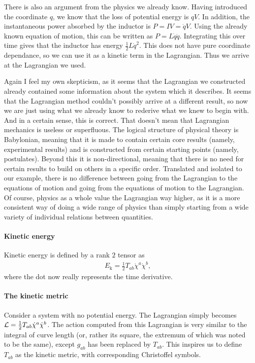 There is also an argument from the physics we already know. Having introduced the coordinate $q$, we know that the loss of potential energy is $qV$. In addition, the instantaneous power absorbed by the inductor is $P = IV = \dot{q}V$. Using the already known equation of motion, this can be written as $P = L\dot{q}\ddot{q}$. Integrating this over time gives that the inductor has energy $\frac{1}{2}L\dot{q}^{2}$. This does not have pure coordinate dependance, so we can use it as a kinetic term in the Lagrangian. Thus we arrive at the Lagrangian we used.

Again I feel my own skepticism, as it seems that the Lagrangian we constructed already contained some information about the system which it describes. It seems that the Lagrangian method couldn't possibly arrive at a different result, so now we are just using what we already know to rederive what we knew to begin with. And in a certain sense, this is correct. That doesn't mean that Lagrangian mechanics is useless or superfluous. The logical structure of physical theory is Babylonian, meaning that it is made to contain certain core results (namely, experimental results) and is constructed from certain starting points (namely, postulates). Beyond this it is non-directional, meaning that there is no need for certain results to build on others in a specific order. Translated and isolated to our example, there is no difference between going from the Lagrangian to the equations of motion and going from the equations of motion to the Lagrangian. Of course, physics as a whole value the Lagrangian way higher, as it is a more consistent way of doing a wide range of physics than simply starting from a wide variety of individual relations between quantities.

\paragraph{Kinetic energy}
Kinetic energy is defined by a rank $2$ tensor as
\begin{align*}
	E_{\text{k}} = \frac{1}{2}T_{ab}\dot{\chi}^{a}\dot{\chi}^{b},
\end{align*}
where the dot now really represents the time derivative.

\paragraph{The kinetic metric}
Consider a system with no potential energy. The Lagrangian simply becomes $\mathcal{L} = \frac{1}{2}T_{ab}\dot{\chi}^{a}\dot{\chi}^{b}$. The action computed from this Lagrangian is very similar to the integral of curve length (or, rather its square, the extremum of which was noted to be the same), except $g_{ab}$ has been replaced by $T_{ab}$. This inspires us to define $T_{ab}$ as the kinetic metric, with corresponding Christoffel symbols.

